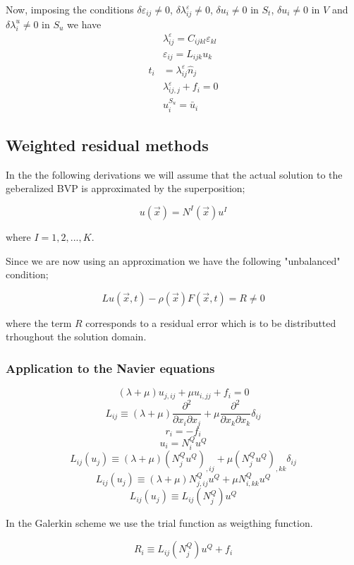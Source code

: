 Now, imposing the conditions $\delta {\varepsilon _{ij}} \neq 0$, $\delta \lambda _{ij}^\varepsilon  \neq 0$, $\delta {u_i} \neq 0$ in $S_t$, $\delta {u_i} \neq 0$ in $V$ and $\delta \lambda _i^u \neq 0$ in $S_u$ we have
%
\begin{align}
&\lambda _{ij}^\varepsilon  = C_{ijkl} \varepsilon_{kl}\\
&\varepsilon_{ij} = {L_{ijk}}{u_k}\\
t_i &= \lambda_{ij}^\varepsilon \hat{n}_j\\
&\lambda _{ij,j}^\varepsilon  + {f_i} = 0\\
&u_i^{S_u} = \bar{u}_i
\end{align}

\subsection{Weighted residual methods}
In the the following derivations we will assume that the actual solution to the geberalized BVP is approximated by the superposition;

\[u(\vec x) = {N^I}(\vec x){u^I}\]

where $I=1,2,...,K$.

Since we are now using an approximation we have the following "unbalanced" condition;

\[Lu(\vec x,t) - \rho (\vec x)F(\vec x,t) = R \ne 0\]

where the term $R$ corresponds to a residual error which is to be distributted trhoughout the solution domain.



\subsubsection*{Application to the Navier equations}

\[(\lambda  + \mu ){u_{j,ij}} + \mu {u_{i,jj}} + {f_i} = 0\]
\[{L_{ij}} \equiv (\lambda  + \mu )\frac{{{\partial ^2}}}{{\partial {x_i}\partial {x_j}}} + \mu \frac{{{\partial ^2}}}{{\partial {x_k}\partial {x_k}}}{\delta _{ij}}\]
\[{r_i} =  - {f_i}\]
\[{u_i} = N_i^Q{u^Q}\]
\[{L_{ij}}({u_j}) \equiv (\lambda  + \mu ){(N_j^Q{u^Q})_{,ij}} + \mu {(N_j^Q{u^Q})_{,kk}}{\delta _{ij}}\]
\[{L_{ij}}({u_j}) \equiv (\lambda  + \mu )N_{j,ij}^Q{u^Q} + \mu N_{i,kk}^Q{u^Q}\]
\[{L_{ij}}({u_j}) \equiv {L_{ij}}(N_j^Q){u^Q}\]

In the Galerkin scheme we use the trial function as weigthing function.

\[{R_i} \equiv {L_{ij}}(N_j^Q){u^Q} + {f_i}\]


